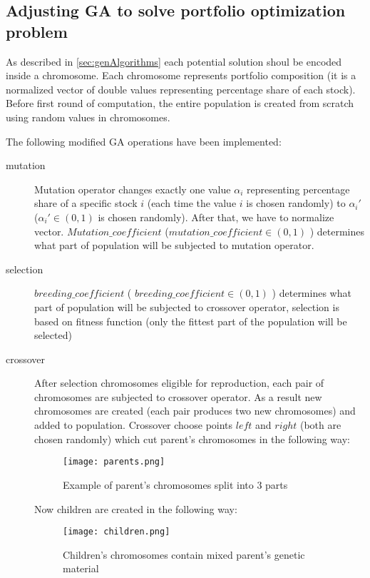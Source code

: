 \subsection{Adjusting GA to solve portfolio optimization problem}

As described in \ref{sec:genAlgorithms} each potential solution shoul be encoded inside a chromosome. 
Each chromosome represents portfolio composition (it is a normalized vector of double values representing percentage share of each stock).
Before first round of computation, the entire population is created from scratch using random values in chromosomes.

The following modified GA operations have been implemented:
\begin{description}
  \item [mutation]
      Mutation operator changes exactly one value $ \alpha_{i} $ representing percentage share of a specific stock $i$ (each time the value $i$ is chosen randomly)
      to $\alpha_{i}'$ ($\alpha_{i}' \in (0,1)$ is chosen randomly). 
      After that, we have to normalize vector.
      $Mutation\_coefficient$ ($mutation\_coefficient \in (0,1)$ ) determines what part of population will be subjected to mutation operator.
  \item [selection]
      $breeding\_coefficient$ ( $breeding\_coefficient \in (0,1)$ ) determines what part of population will be subjected to crossover operator, selection is based on 
      fitness function (only the fittest part of the population will be selected)
  \item [crossover]
      After selection chromosomes eligible for reproduction, each pair of chromosomes are subjected to crossover operator. As a result new chromosomes are created (each pair
      produces two new chromosomes) and added to population. Crossover choose points $left$  and $right$ (both are chosen randomly) which cut parent's chromosomes in the following
      way: 
	  \begin{figure}[H]
	    \begin{center}
	      \texttt{[image: parents.png]}
	    \end{center}
	    \caption{Example of parent's chromosomes split into 3 parts}
	  \end{figure}

	Now children are created in the following way:    
	  \begin{figure}[H]
	    \begin{center}
	      \texttt{[image: children.png]}
	    \end{center}
	    \caption{Children's chromosomes contain mixed parent's genetic material}
	  \end{figure}

\end{description}

